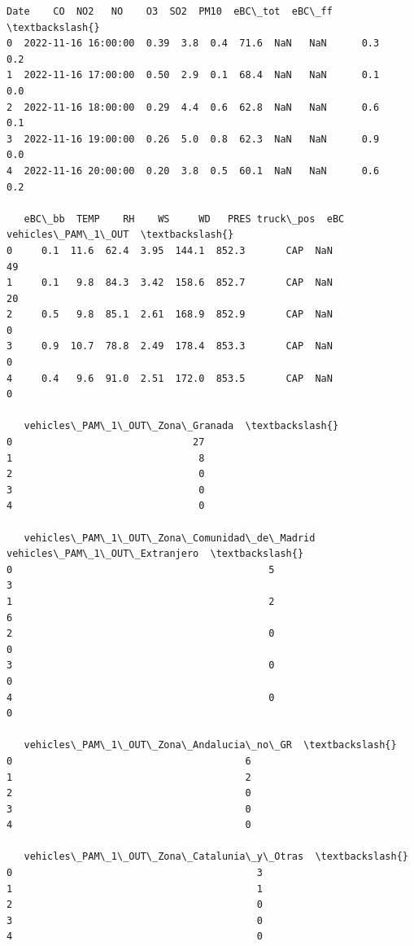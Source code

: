 \documentclass[11pt]{article}
\makeatletter
\newcommand{\boxspacing}{\kern\kvtcb@left@rule\kern\kvtcb@boxsep}
\newcommand{\prompt}[4]{
        {\ttfamily\llap{{\color{#2}[#3]:\hspace{3pt}#4}}\vspace{-\baselineskip}}
    }
\makeatother
\begin{document}
            \begin{tcolorbox}[breakable, size=fbox, boxrule=.5pt, pad at break*=1mm, opacityfill=0]
\prompt{Out}{outcolor}{56}{\boxspacing}
\begin{Verbatim}[commandchars=\\\{\}]
                  Date    CO  NO2   NO    O3  SO2  PM10  eBC\_tot  eBC\_ff  \textbackslash{}
0  2022-11-16 16:00:00  0.39  3.8  0.4  71.6  NaN   NaN      0.3     0.2
1  2022-11-16 17:00:00  0.50  2.9  0.1  68.4  NaN   NaN      0.1     0.0
2  2022-11-16 18:00:00  0.29  4.4  0.6  62.8  NaN   NaN      0.6     0.1
3  2022-11-16 19:00:00  0.26  5.0  0.8  62.3  NaN   NaN      0.9     0.0
4  2022-11-16 20:00:00  0.20  3.8  0.5  60.1  NaN   NaN      0.6     0.2

   eBC\_bb  TEMP    RH    WS     WD   PRES truck\_pos  eBC  vehicles\_PAM\_1\_OUT  \textbackslash{}
0     0.1  11.6  62.4  3.95  144.1  852.3       CAP  NaN                  49
1     0.1   9.8  84.3  3.42  158.6  852.7       CAP  NaN                  20
2     0.5   9.8  85.1  2.61  168.9  852.9       CAP  NaN                   0
3     0.9  10.7  78.8  2.49  178.4  853.3       CAP  NaN                   0
4     0.4   9.6  91.0  2.51  172.0  853.5       CAP  NaN                   0

   vehicles\_PAM\_1\_OUT\_Zona\_Granada  \textbackslash{}
0                               27
1                                8
2                                0
3                                0
4                                0

   vehicles\_PAM\_1\_OUT\_Zona\_Comunidad\_de\_Madrid  vehicles\_PAM\_1\_OUT\_Extranjero  \textbackslash{}
0                                            5                              3
1                                            2                              6
2                                            0                              0
3                                            0                              0
4                                            0                              0

   vehicles\_PAM\_1\_OUT\_Zona\_Andalucia\_no\_GR  \textbackslash{}
0                                        6
1                                        2
2                                        0
3                                        0
4                                        0

   vehicles\_PAM\_1\_OUT\_Zona\_Catalunia\_y\_Otras  \textbackslash{}
0                                          3
1                                          1
2                                          0
3                                          0
4                                          0


\end{Verbatim}
\end{tcolorbox}
\end{document}
